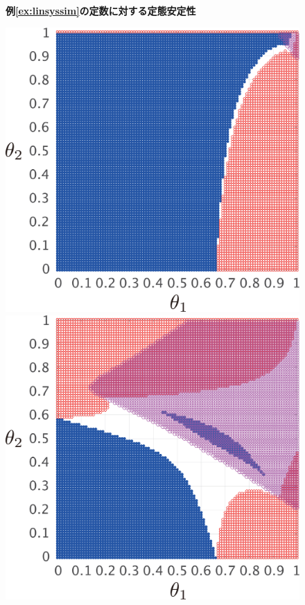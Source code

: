\documentclass[tombow,dvipdfmx]{corona-a5-1.1}
\begin{document}
\begin{figure}[t]
{    
  }
  \medskip
\caption{\textbf{例\ref{ex:linsyssim}の定数に対する定態安定性}}
\label{fig:gamthm}
\medskip
\end{figure}

\begin{figure}[t]
  \centering
  {
  \begin{minipage}{0.49\linewidth}
    \centering
    \includegraphics[width = .8\linewidth]{figs/gam01ex}
    \medskip
  \end{minipage}
  \begin{minipage}{0.49\linewidth}
    \centering
    \includegraphics[width = .8\linewidth]{figs/gam2ex}

\end{minipage}}
\end{figure}
\end{document}
